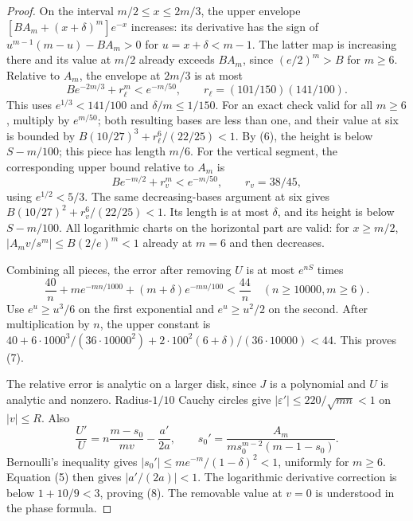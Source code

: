 \documentclass[11pt]{article}
\begin{document}
\begin{proof}
On the interval $m/2\le x\le2m/3$, the upper envelope
$[BA_m+(x+\delta)^m]e^{-x}$ increases: its derivative has the sign of
$u^{m-1}(m-u)-BA_m>0$ for $u=x+\delta<m-1$.
The latter map is increasing there and its value at $m/2$ already
exceeds $BA_m$, since $(e/2)^m>B$ for $m\ge6$.
Relative to $A_m$, the envelope at $2m/3$ is at most
\[
 B e^{-2m/3}+r_\ell^m<e^{-m/50},\qquad
 r_\ell=(101/150)(141/100).
\]
This uses $e^{1/3}<141/100$ and $\delta/m\le1/150$.
For an exact check valid for all $m\ge6$, multiply by $e^{m/50}$;
both resulting bases are less than one, and their value at six is bounded by
$B(10/27)^3+r_\ell^6/(22/25)<1$.
By (6), the height is below $S-m/100$; this piece has length $m/6$.
For the vertical segment, the corresponding upper bound relative to
$A_m$ is
\[
 B e^{-m/2}+r_v^m<e^{-m/50},\qquad r_v=38/45,
\]
using $e^{1/2}<5/3$. The same decreasing-bases argument at six gives
$B(10/27)^2+r_v^6/(22/25)<1$. Its length is at most $\delta$, and its
height is below $S-m/100$.
All logarithmic charts on the horizontal part are valid: for $x\ge m/2$,
$|A_mv/s^m|\le B(2/e)^m<1$ already at $m=6$ and then decreases.

Combining all pieces, the error after removing $U$ is at most $e^{nS}$
times
\[
 \frac{40}{n}+m e^{-mn/1000}+(m+\delta)e^{-mn/100}
 <\frac{44}{n}\quad(n\ge10000,m\ge6).                \tag{11}
\]
Use $e^u\ge u^3/6$ on the first exponential and $e^u\ge u^2/2$ on
the second. After multiplication by $n$, the upper constant is
$40+6\cdot1000^3/(36\cdot10000^2)
 +2\cdot100^2(6+\delta)/(36\cdot10000)<44$.
This proves (7).

The relative error is analytic on a larger disk, since $J$ is a polynomial
and $U$ is analytic and nonzero. Radius-$1/10$ Cauchy circles give
$|\varepsilon'|\le220/\sqrt{mn}<1$ on $|v|\le R$.
Also
\[
 \frac{U'}U=n\frac{m-s_0}{mv}-\frac{a'}{2a},\qquad
 s_0'=\frac{A_m}{m s_0^{m-2}(m-1-s_0)}.
\]
Bernoulli's inequality gives
$|s_0'|\le me^{-m}/(1-\delta)^2<1$, uniformly for $m\ge6$.
Equation (5) then gives $|a'/(2a)|<1$.
The logarithmic derivative correction is below $1+10/9<3$, proving (8).
The removable value at $v=0$ is understood in the phase formula.
\end{proof}
\end{document}
